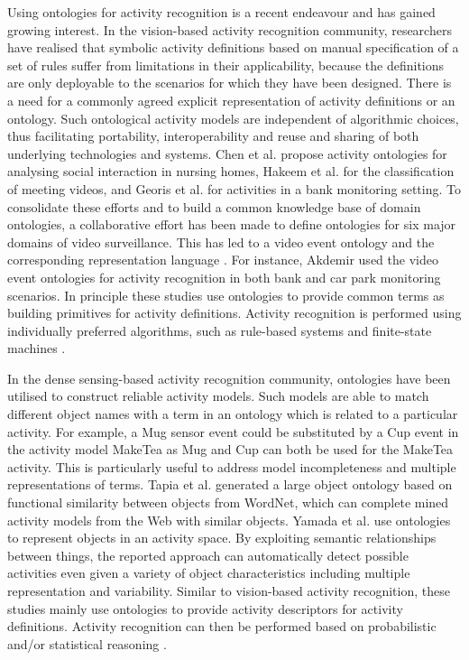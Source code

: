 Using ontologies for activity recognition is a recent endeavour and has gained growing interest. In the vision-based activity recognition community, researchers have realised that symbolic activity definitions based on manual specification of a set of rules suffer from limitations in their applicability, because the definitions are only deployable to the scenarios for which they have been designed. There is a need for a commonly agreed explicit representation of activity definitions or an ontology. Such ontological activity models are independent of algorithmic choices, thus facilitating portability, interoperability and reuse and sharing of both underlying technologies and systems. Chen et al. \cite{Chen2004} propose activity ontologies for analysing social interaction in nursing homes, Hakeem et al. \cite{Hakeem2004} for the classification of meeting videos, and Georis et al. \cite{Georis2004} for activities in a bank monitoring setting. To consolidate these efforts and to build a common knowledge base of domain ontologies, a collaborative effort has been made to define ontologies for six major domains of video surveillance. This has led to a video event ontology \cite{Nevatia2004} and the corresponding representation language \cite{Francois2005}. For instance, Akdemir \cite{Akdemir2008} used the video event ontologies for activity recognition in both bank and car park monitoring scenarios. In principle these studies use ontologies to provide common terms as building primitives for activity definitions. Activity recognition is performed using individually preferred algorithms, such as rule-based systems \cite{Hakeem2004} and finite-state machines \cite{Akdemir2008}. 

In the dense sensing-based activity recognition community, ontologies have been utilised to construct reliable activity models. Such models are able to match different object names with a term in an ontology which is related to a particular activity. For example, a Mug sensor event could be substituted by a Cup event in the activity model MakeTea as Mug and Cup can both be used for the MakeTea activity. This is particularly useful to address model incompleteness and multiple representations of terms. Tapia et al. \cite{Tapia2006} generated a large object ontology based on functional similarity between objects from WordNet, which can complete mined activity models from the Web with similar objects. Yamada et al. \cite{Yamada2007} use ontologies to represent objects in an activity space. By exploiting semantic relationships between things, the reported approach can automatically detect possible activities even given a variety of object characteristics including multiple representation and variability. Similar to vision-based activity recognition, these studies mainly use ontologies to provide activity descriptors for activity definitions. Activity recognition can then be performed based on probabilistic and/or statistical reasoning \cite{Tapia2006} \cite{Yamada2007}.

